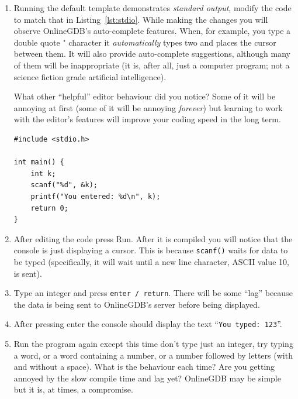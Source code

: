 \documentclass{lab}
\begin{document}
\begin{enumerate}

\item Running the default template demonstrates \textit{standard output}, modify the code to match that in Listing~\ref{lst:stdio}. While making the changes you will observe OnlineGDB's auto-complete features. When, for example, you type a double quote " character it \textit{automatically} types two and places the cursor between them. It will also provide auto-complete suggestions, although many of them will be inappropriate (it is, after all, just a computer program; not a science fiction grade artificial intelligence).

What other ``helpful'' editor behaviour did you notice? Some of it will be annoying at first (some of it will be annoying \textit{forever}) but learning to work with the editor's features will improve your coding speed in the long term.

\begin{lstlisting}[style=CStyle,caption=A basic C program which demonstrates input and output.,label=lst:stdio]
#include <stdio.h>

int main() {
	int k;
	scanf("%d", &k);
	printf("You entered: %d\n", k);
	return 0;
}
\end{lstlisting}

\item After editing the code press Run. After it is compiled you will notice that the console is just displaying a cursor. This is because \texttt{scanf()} waits for data to be typed (specifically, it will wait until a new line character, ASCII value 10, is sent).

\item Type an integer and press \texttt{enter / return}. There will be some ``lag'' because the data is being sent to OnlineGDB's server before being displayed.

\item After pressing enter the console should display the text ``\texttt{You typed: 123}''.

\item Run the program again except this time don't type just an integer, try typing a word, or a word containing a number, or a number followed by letters (with and without a space). What is the behaviour each time? Are you getting annoyed by the slow compile time and lag yet? OnlineGDB may be simple but it is, at times, a compromise.

\end{enumerate}
\end{document}
